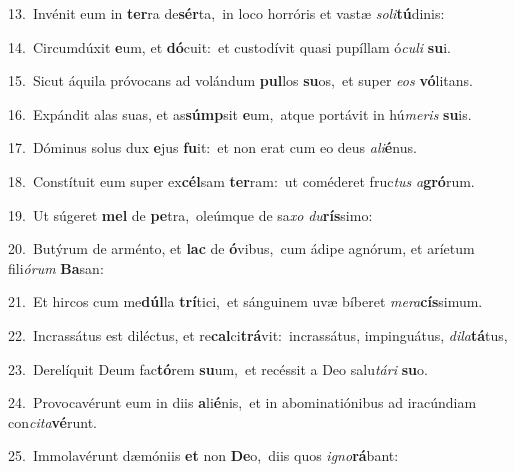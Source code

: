 {\numbfont\textcolor{\numbcolor}{13.}}~Invénit eum in \textbf{ter}\-ra de\-\textbf{sér}\-ta,~\star in loco horróris et vastæ \textit{so}\-\textit{li}\textbf{tú}dinis:\par
{\numbfont\textcolor{\numbcolor}{14.}}~Circumdúxit \textbf{e}\-um, et \textbf{dó}\-cuit:~\star et custodívit quasi pupíllam ó\-\textit{cu}\-\textit{li} \textbf{su}\-i.\par
{\numbfont\textcolor{\numbcolor}{15.}}~Sicut áquila próvocans ad volándum \textbf{pul}\-los \textbf{su}\-os,~\star et super \textit{e}\-\textit{os} \textbf{vó}\-litans.\par
{\numbfont\textcolor{\numbcolor}{16.}}~Expándit alas suas, et as\-\textbf{súmp}\-sit \textbf{e}\-um,~\star atque portávit in hú\-\textit{me}\-\textit{ris} \textbf{su}\-is.\par
{\numbfont\textcolor{\numbcolor}{17.}}~Dóminus solus dux \textbf{e}\-jus \textbf{fu}\-it:~\star et non erat cum eo deus \textit{a}\-\textit{li}\textbf{é}nus.\par
{\numbfont\textcolor{\numbcolor}{18.}}~Constítuit eum super ex\-\textbf{cél}\-sam \textbf{ter}\-ram:~\star ut coméderet fruc\textit{tus} \textit{a}\-\textbf{gró}rum.\par
{\numbfont\textcolor{\numbcolor}{19.}}~Ut súgeret \textbf{mel} de \textbf{pe}\-tra,~\star oleúmque de sa\textit{xo} \textit{du}\-\textbf{rís}simo:\par
{\numbfont\textcolor{\numbcolor}{20.}}~Butýrum de arménto, et \textbf{lac} de \textbf{ó}\-vibus,~\star cum ádipe agnórum, et aríetum fili\-\textit{ó}\-\textit{rum} \textbf{Ba}\-san:\par
{\numbfont\textcolor{\numbcolor}{21.}}~Et hircos cum me\-\textbf{dúl}\-la \textbf{trí}\-tici,~\star et sánguinem uvæ bíberet \textit{me}\-\textit{ra}\textbf{cís}simum.\par
{\numbfont\textcolor{\numbcolor}{22.}}~Incrassátus est diléctus, et re\-\textbf{cal}\-ci\-\textbf{trá}\-vit:~\star incrassátus, impinguátus, \textit{di}\-\textit{la}\textbf{tá}tus,\par
{\numbfont\textcolor{\numbcolor}{23.}}~Derelíquit Deum fac\-\textbf{tó}\-rem \textbf{su}\-um,~\star et recéssit a Deo salu\-\textit{tá}\-\textit{ri} \textbf{su}\-o.\par
{\numbfont\textcolor{\numbcolor}{24.}}~Provocavérunt eum in diis \textbf{a}\-li\-\textbf{é}\-nis,~\star et in abominatiónibus ad iracúndiam con\-\textit{ci}\-\textit{ta}\textbf{vé}runt.\par
{\numbfont\textcolor{\numbcolor}{25.}}~Immolavérunt dæmóniis \textbf{et} non \textbf{De}\-o,~\star diis quos \textit{i}\-\textit{gno}\textbf{rá}bant:\par
